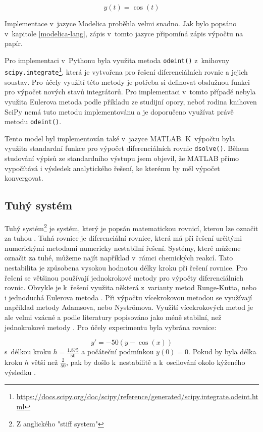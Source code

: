 \begin{equation}
    y(t) = \cos(t)
\end{equation}


Implementace v~jazyce Modelica proběhla velmi snadno. Jak bylo popsáno v~kapitole \ref{modelica-lang}, zápis v~tomto jazyce připomíná zápis výpočtu na papír. 

Pro implementaci v~Pythonu byla využita metoda \texttt{odeint()} z~knihovny \texttt{scipy.integrate}\footnote{\url{https://docs.scipy.org/doc/scipy/reference/generated/scipy.integrate.odeint.html}}, která je vytvořena pro řešení diferenciálních rovnic a jejich soustav. Pro účely využití této metody je potřeba si definovat obslužnou funkci pro výpočet nových stavů integrátorů. Pro implementaci v~tomto případě nebyla využita Eulerova metoda podle příkladu ze studijní opory, neboť rodina knihoven SciPy nemá tuto metodu implementovánu a je doporučeno využívat právě metodu \texttt{odeint()}.

Tento model byl implementován také v~jazyce MATLAB. K~výpočtu byla využita standardní funkce pro výpočet diferenciálních rovnic \texttt{dsolve()}. Během studování výpisů ze standardního výstupu jsem objevil, že MATLAB přímo vypočítává i výsledek analytického řešení, ke kterému by měl výpočet konvergovat. 


\subsection*{Tuhý systém}
\label{tuhy}
Tuhý systém\footnote{Z anglického "stiff system"} je systém, který je popsán matematickou rovnicí, kterou lze označit za tuhou \cite{hairer}. Tuhá rovnice je diferenciální rovnice, která má při řešení určitými numerickými metodami numericky nestabilní řešení. Systémy, které můžeme označit za tuhé, můžeme najít například v~rámci chemických reakcí. Tato nestabilita je způsobena vysokou hodnotou délky kroku při řešení rovnice. Pro řešení se většinou používají jednokrokové metody pro výpočty diferenciálních rovnic. Obvykle je k~řešení využita některá z~varianty metod Runge-Kutta, nebo i jednoduchá Eulerova metoda \cite{IMS-skripta}. Při výpočtu vícekrokovou metodou se využívají například metody Adamsova, nebo Nyströmova. Využití vícekrokových metod je ale velmi vzácné a podle literatury popisováno jako méně stabilní, než jednokrokové metody \cite{hairer}. Pro účely experimentu byla vybrána rovnice:

\begin{equation}
    y' = -50(y - \cos{(x)})
\end{equation}
s~délkou kroku $h = \frac{1.875}{50}$ a počáteční podmínkou $y(0) = 0$. Pokud by byla délka kroku $h$ větší než $\frac{2}{50}$, pak by došlo k~nestabilitě a k~oscilování okolo kýženého výsledku \cite{hairer}.

